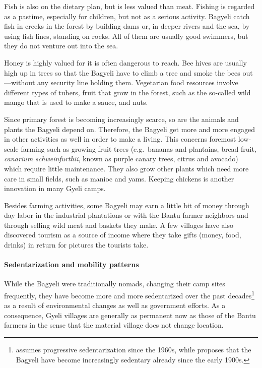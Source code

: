 Fish is also on the dietary plan, but is less valued than meat. Fishing is regarded as a pastime, especially for children, but not as a serious activity. Bagyeli catch fish in creeks in the forest by building dams or, in deeper rivers and the sea, by using fish lines, standing on rocks. All of them are usually good swimmers, but they do not venture out into the sea.

Honey is highly valued for it is often dangerous to reach. Bee hives are usually high up in trees so that the Bagyeli have to climb a tree and smoke the bees out---without any security line holding them.
Vegetarian food resources involve different types of tubers, fruit that grow in the forest, such as the so-called wild mango that is used to make a sauce, and nuts. 

Since primary forest is becoming increasingly scarce, so are the animals and plants the Bagyeli depend on. Therefore, the Bagyeli get more and more engaged in other activities as well in order to make a living.  This concerns foremost low-scale farming such as growing fruit trees (e.g.\ bananas and plantains, bread fruit, {\itshape canarium schweinfurthii}, known as purple canary trees, citrus and avocado) which require little maintenance. They also grow other plants which need more care in small fields, such as manioc and yams. Keeping chickens is another innovation in many Gyeli camps.

Besides farming activities, some Bagyeli may earn a little bit of money through day labor in the industrial plantations or with the Bantu farmer neighbors and through selling wild meat and baskets they make. A few villages have also discovered tourism as a source of income where they take gifts (money, food, drinks) in return for pictures the tourists take.

\paragraph{Sedentarization and mobility patterns}	
While the Bagyeli were traditionally nomads, changing their camp sites frequently, they have become more and more sedentarized over the past decades\footnote{\citet[25]{renaud76} assumes progressive sedentarization since the 1960s, while \citet[86]{joiris94} proposes that the Bagyeli have become increasingly sedentary already since the early 1900s.} as a result of environmental changes as well as government efforts. As a consequence, Gyeli villages are generally as permanent now as those of the Bantu farmers in the sense that the material village does not change location. 

